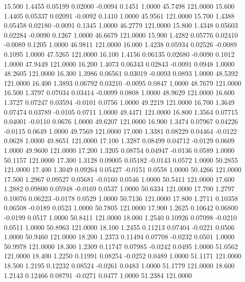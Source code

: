   15.500   1.4455   0.05199   0.02000  -0.0094   0.1451   1.0000  45.7498 121.0000
  15.600   1.4405   0.05337   0.02091  -0.0092   0.1410   1.0000  45.9561 121.0000
  15.700   1.4388   0.05458   0.02180  -0.0091   0.1345   1.0000  46.2779 121.0000
  15.800   1.4348   0.05603   0.02284  -0.0090   0.1267   1.0000  46.6679 121.0000
  15.900   1.4282   0.05776   0.02410  -0.0089   0.1205   1.0000  46.9811 121.0000
  16.000   1.4238   0.05934   0.02526  -0.0089   0.1095   1.0000  47.5265 121.0000
  16.100   1.4156   0.06135   0.02680  -0.0090   0.1012   1.0000  47.9449 121.0000
  16.200   1.4073   0.06343   0.02843  -0.0091   0.0948   1.0000  48.2605 121.0000
  16.300   1.3986   0.06561   0.03019  -0.0093   0.0893   1.0000  48.5392 121.0000
  16.400   1.3893   0.06792   0.03210  -0.0095   0.0847   1.0000  48.7679 121.0000
  16.500   1.3797   0.07034   0.03414  -0.0099   0.0808   1.0000  48.9629 121.0000
  16.600   1.3727   0.07247   0.03594  -0.0101   0.0756   1.0000  49.2219 121.0000
  16.700   1.3649   0.07474   0.03789  -0.0105   0.0711   1.0000  49.4471 121.0000
  16.800   1.3564   0.07715   0.04001  -0.0110   0.0676   1.0000  49.6207 121.0000
  16.900   1.3474   0.07967   0.04226  -0.0115   0.0649   1.0000  49.7569 121.0000
  17.000   1.3381   0.08229   0.04464  -0.0122   0.0628   1.0000  49.8651 121.0000
  17.100   1.3287   0.08499   0.04712  -0.0129   0.0609   1.0000  49.9600 121.0000
  17.200   1.3205   0.08754   0.04947  -0.0136   0.0589   1.0000  50.1157 121.0000
  17.300   1.3128   0.09005   0.05182  -0.0143   0.0572   1.0000  50.2855 121.0000
  17.400   1.3049   0.09264   0.05427  -0.0151   0.0558   1.0000  50.4266 121.0000
  17.500   1.2967   0.09527   0.05681  -0.0160   0.0546   1.0000  50.5411 121.0000
  17.600   1.2882   0.09800   0.05948  -0.0169   0.0537   1.0000  50.6334 121.0000
  17.700   1.2797   0.10076   0.06223  -0.0178   0.0529   1.0000  50.7136 121.0000
  17.800   1.2711   0.10358   0.06508  -0.0189   0.0523   1.0000  50.7805 121.0000
  17.900   1.2625   0.10642   0.06800  -0.0199   0.0517   1.0000  50.8411 121.0000
  18.000   1.2540   0.10926   0.07098  -0.0210   0.0511   1.0000  50.8963 121.0000
  18.100   1.2455   0.11213   0.07404  -0.0221   0.0506   1.0000  50.9460 121.0000
  18.200   1.2373   0.11494   0.07708  -0.0232   0.0501   1.0000  50.9978 121.0000
  18.300   1.2309   0.11747   0.07985  -0.0242   0.0495   1.0000  51.0562 121.0000
  18.400   1.2250   0.11991   0.08254  -0.0252   0.0489   1.0000  51.1171 121.0000
  18.500   1.2195   0.12232   0.08524  -0.0261   0.0483   1.0000  51.1779 121.0000
  18.600   1.2143   0.12466   0.08791  -0.0271   0.0477   1.0000  51.2384 121.0000
